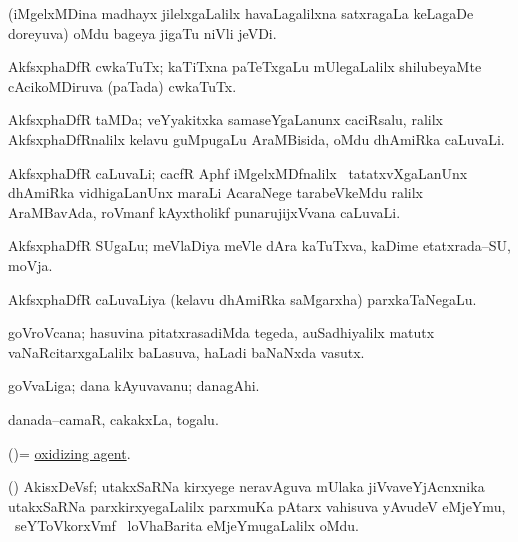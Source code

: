 \bentry
{}
\gl{\nA}
\bmng
(iMgelxMDina madhayx jilelxgaLalilx havaLagalilxna satxragaLa keLagaDe doreyuva) oMdu bageya jigaTu niVli jeVDi. 
\emng
\eentry

\bentry
{}
\gl{\nA}
\bmng
AkfsxphaDfR cwkaTuTx; kaTiTxna paTeTxgaLu mUlegaLalilx shilubeyaMte cAcikoMDiruva (paTada) cwkaTuTx.  
\emng
\eentry

\bentry
{}
\gl{\nA}
\bmng
AkfsxphaDfR taMDa; veYyakitxka samaseYgaLanunx caciRsalu, ralilx AkfsxphaDfRnalilx kelavu guMpugaLu AraMBisida, oMdu dhAmiRka caLuvaLi. 
\emng
\eentry

\bentry
{}
\gl{\nA}
\bmng
AkfsxphaDfR caLuvaLi; cacfR Aphf iMgelxMDfnalilx \roVkAyx\ tatatxvXgaLanUnx dhAmiRka vidhigaLanUnx maraLi AcaraNege tarabeVkeMdu ralilx AraMBavAda, roVmanf kAyxtholikf punarujijxVvana caLuvaLi. 
\emng
\eentry

\bentry
{}
\gl{\nA}
\bmng
AkfsxphaDfR SUgaLu; meVlaDiya meVle dAra kaTuTxva, kaDime etatxrada--SU, moVja. 
\emng
\eentry

\bentry
{}
\gl{\nA}
\bmng
AkfsxphaDfR caLuvaLiya (kelavu dhAmiRka saMgarxha) parxkaTaNegaLu. 
\emng
\eentry

\bentry
{}
\gl{\nA}
\bmng
goVroVcana; hasuvina pitatxrasadiMda tegeda, auSadhiyalilx matutx vaNaRcitarxgaLalilx baLasuva, haLadi baNaNxda vasutx. 
\emng
\eentry

\bentry
{}
\gl{\nA}
\bmng
goVvaLiga; dana kAyuvavanu; danagAhi. 
\emng
\eentry

\bentry
{}
\gl{\nA}
\bmng
danada--camaR, cakakxLa, togalu. 
\emng
\eentry

\bentry
{}
\gl{\nA}
\bmng
(\ravi)= \hyperlink{oxidizing agent}{oxidizing agent}. 
\emng
\eentry

\bentry
{}
\gl{\nA}
\bmng
(\jiVra) AkisxDeVsf; utakxSaRNa kirxyege neravAguva mUlaka jiVvaveYjAcnxnika utakxSaRNa parxkirxyegaLalilx parxmuKa pAtarx vahisuva yAvudeV eMjeYmu, \kanmu\ seYToVkorxVmf \mo\ loVhaBarita eMjeYmugaLalilx oMdu. 
\emng
\eentry

